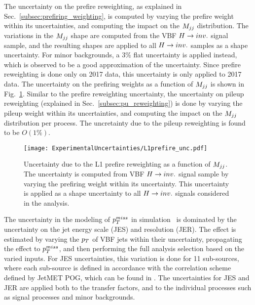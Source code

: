 The uncertainty on the prefire reweighting, as explained in Sec.~\ref{subsec:prefiring_weighting}, is computed by varying the prefire weight
within its uncertainties, and computing the impact on the $M_{jj}$ distribution. The variations in the $M_{jj}$ shape are computed from the VBF $H \rightarrow inv.$
signal sample, and the resulting shapes are applied to all $H \rightarrow inv.$ samples as a shape uncertainty. For minor backgrounds,
a $3\%$ flat uncertainty is applied instead, which is observed to be a good approximation of the uncertainty. Since prefire reweighting is done only
on 2017 data, this uncertainty is only applied to 2017 data.
The uncertainty on the prefiring weights as a function of $M_{jj}$ is shown in Fig.~\ref{fig:l1prefire_unc}.
Similar to the prefire reweighting uncertainty, the uncertainty on pileup reweighting (explained in Sec.~\ref{subsec:pu_reweighting}) is done by varying the pileup
weight within its uncertainties, and computing the impact on the $M_{jj}$ distribution per process. The uncretainty due to the pileup reweighting is found to be $O(1\%)$.

\begin{figure}[htbp]
  \centering
  \texttt{[image: ExperimentalUncertainties/L1prefire\_unc.pdf]}
  \caption{Uncertainty due to the L1 prefire reweighting as a function of $M_{jj}$. The uncertainty is computed from VBF $H \rightarrow inv.$
  signal sample by varying the prefiring weight within its uncertainty. This uncertainty is applied as a shape uncertainty to all
  $H \rightarrow inv.$ signals considered in the analysis.}
  \label{fig:l1prefire_unc}
\end{figure}



The uncertainty in the modeling of $p_T^{miss}$ in simulation~\cite{Khachatryan:2014gga} is dominated by the uncertainty on the jet energy scale (JES) 
and resolution (JER). The effect is estimated by varying the $p_T$ of VBF jets within their uncertainty, propagating the effect to $p_T^{miss}$, and then 
performing the full analysis selection based on the varied inputs. For JES uncertainties, this variation is done for 11 sub-sources, where each 
sub-source is defined in accordance with the correlation scheme defined by JetMET POG, which can be found in \cite{jetMET_twiki}. The uncertainties for JES and
JER are applied both to the transfer factors, and to the individual processes such as signal processes and minor backgrounds.

